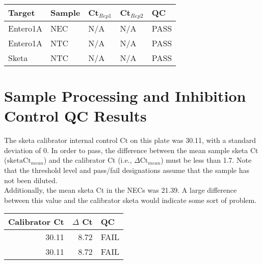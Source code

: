 \documentclass{article}\usepackage[]{graphicx}\usepackage[]{color}
\begin{document}
\begin{table}[ht]
\centering
\begin{tabular}{lllll}
  \hline
Target & Sample & Ct$_{Rep1}$ & Ct$_{Rep2}$ & QC \\ 
  \hline
Entero1A & NEC & N/A & N/A & PASS \\ 
  Entero1A & NTC & N/A & N/A & PASS \\ 
  Sketa & NTC & N/A & N/A & PASS \\ 
   \hline
\end{tabular}
\end{table}


\pagebreak
\section{Sample Processing and Inhibition Control QC Results}

The sketa calibrator internal control Ct on this plate was 30.11, with a standard deviation of 0. In order to pass,
the difference between the mean sample sketa Ct ($\text{sketaCt}_{mean}$) and the calibrator Ct (i.e., $\Delta \text{Ct}_{mean}$)
must be less than 1.7. Note that the threshold level and pass/fail designations assume that the sample has not
been diluted. \\

Additionally, the mean sketa Ct in the NECs was 21.39. A large difference between this value and the calibrator sketa would indicate some sort of problem.

\begin{table}[ht]
\centering
\begin{tabular}{rrl}
  \hline
Calibrator Ct & $\Delta$ Ct & QC \\ 
  \hline
30.11 & 8.72 & FAIL \\ 
  30.11 & 8.72 & FAIL \\ 
   \hline
\end{tabular}
\end{table}
\end{document}
